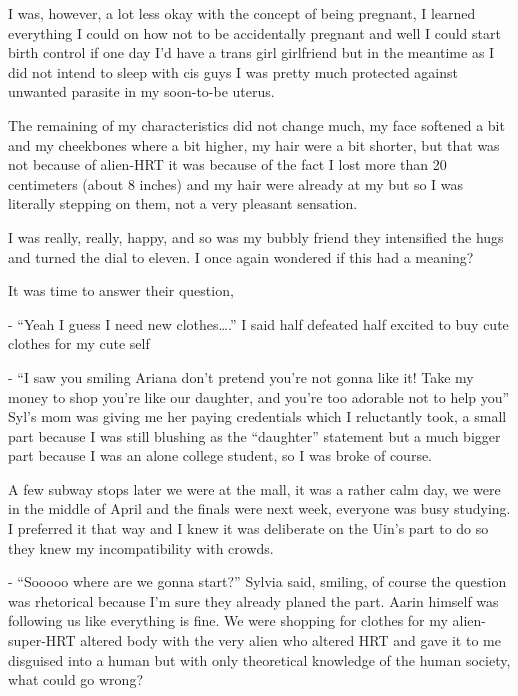 \documentclass[colorlinks,12pt,a4paper]{book}
\begin{document}
 I was, however, a lot less okay with the concept of being pregnant, I learned everything I could on how not to be accidentally
  pregnant and well I could start birth control if one day I'd have a trans girl girlfriend but in the meantime as I did 
  not intend to sleep with cis guys I was pretty much protected against unwanted parasite in my soon-to-be uterus.\par
  \bigskip
 
 The remaining of my characteristics did not change much, my face softened a bit and my cheekbones where a bit higher, 
 my hair were a bit shorter, but that was not because of alien-HRT it was because of the fact I lost more than 20 centimeters 
 (about 8 inches) and my hair were already at my but so I was literally stepping on them, not a very pleasant sensation.\par
 \bigskip
 
 I was really, really, happy, and so was my bubbly friend they intensified the hugs and turned the dial to eleven. 
 I once again wondered if this had a meaning?\par
 \bigskip
 
 It was time to answer their question,\par
 \bigskip
 - “Yeah I guess I need new clothes….” I said half defeated half excited to buy cute clothes for my cute self\par
 \bigskip
 - “I saw you smiling Ariana don't pretend you're not gonna like it! Take my money to shop you're like our daughter, and 
 you're too adorable not to help you” Syl's mom was giving me her paying credentials which I reluctantly took, a small 
 part because I was still blushing as the “daughter” statement but a much bigger part because I was an alone college 
 student, so I was broke of course.\par
 \bigskip
 
 A few subway stops later we were at the mall, it was a rather calm day, we were in the middle of April and the 
 finals were next week, everyone was busy studying. I preferred it that way and I knew it was deliberate on the 
 Uin's part to do so they knew my incompatibility with crowds. \par
 \bigskip
 
 - “Sooooo where are we gonna start?” Sylvia said, smiling, of course the question was rhetorical because I'm sure they 
 already planed the part. Aarin himself was following us like everything is fine. We were shopping for clothes for my 
 alien-super-HRT altered body with the very alien who altered HRT and gave it to me disguised into a human but with only 
 theoretical knowledge of the human society, what could go wrong?
 
\end{document}
